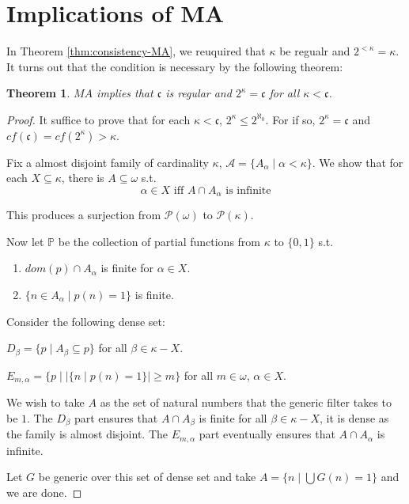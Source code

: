 \documentclass{article}
\newtheorem{theorem}{Theorem}
\begin{document}
\section{Implications of MA}

In Theorem \ref{thm:consistency-MA}, we reuquired that $\kappa$ be regualr and $2^{<\kappa} = \kappa$. It turns out that the condition is necessary by the following theorem:

\begin{theorem}
    $MA$ implies that $\mathfrak{c}$ is regular and $2^\kappa = \mathfrak{c}$ for all $\kappa<\mathfrak{c}$.
\end{theorem}

\begin{proof}
    It suffice to prove that for each $\kappa<\mathfrak{c}$, $2^{\kappa}\leq 2^{\aleph_0}$. For if so, $2^{\kappa}= \mathfrak{c}$ and $cf(\mathfrak{c}) = cf(2^\kappa)>\kappa$.

    Fix a almost disjoint family of cardinality $\kappa$, $\mathcal{A} = \{A_\alpha\mid \alpha<\kappa\}$. We show that for each $X\subseteq \kappa$, there is $A\subseteq \omega$ s.t. $$\alpha\in X\text{ iff }A\cap A_\alpha \text{ is infinite}$$

    This produces a surjection from $\mathcal{P}(\omega)$ to $\mathcal{P}(\kappa)$.

    Now let $\mathbb{P}$ be the collection of partial functions from $\mathcal{\kappa}$ to $\{0,1\}$ s.t. 

    \begin{enumerate}
        \item $dom(p)\cap A_\alpha$ is finite for $\alpha\in X$.
        \item $\{n\in A_\alpha\mid p(n) = 1\}$ is finite.
    \end{enumerate}

    Consider the following dense set:

    $D_\beta = \{p\mid A_\beta\subseteq p\}$ for all $\beta\in \kappa - X$.

    $E_{m,\alpha} = \{p\mid |\{n\mid p(n) = 1\}|\geq m\}$ for all $m\in \omega$, $\alpha\in X$.

    We wish to take $A$ as the set of natural numbers that the generic filter takes to be $1$. The $D_\beta$ part ensures that $A\cap A_\beta$ is finite for all $\beta\in \kappa - X$, it is dense as the family is almost disjoint. The $E_{m,\alpha}$ part eventually ensures that $A\cap A_\alpha$ is infinite.

    Let $G$ be generic over this set of dense set and take $A = \{n\mid \bigcup G(n) = 1\}$ and we are done.
\end{proof}
\end{document}
